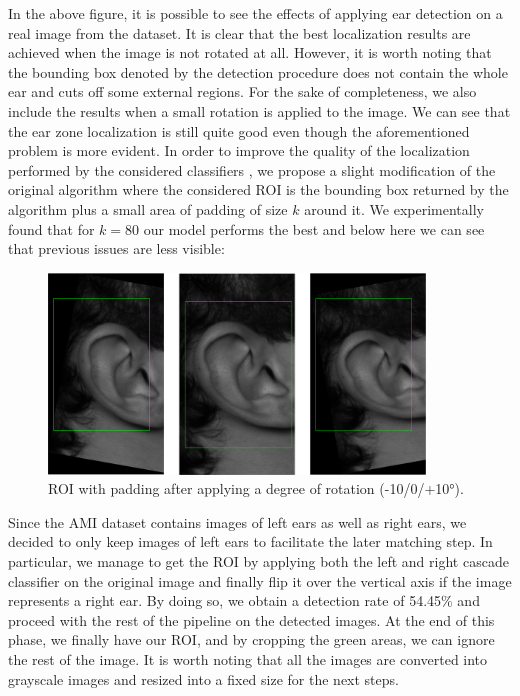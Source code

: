 \documentclass{article}
\begin{document}
In the above figure, it is possible to see the effects of applying ear detection on a real image from the
dataset. It is clear that the best localization results are achieved when the image is not rotated at all.
However, it is worth noting that the bounding box denoted by the detection procedure does not contain the
whole ear and cuts off some external regions.  For the sake of completeness, we also include the results when
a small rotation is applied to the image. We can see that the ear zone localization is still quite good even
though the aforementioned problem is more evident.
In order to improve the quality of the localization performed by the considered classifiers \cite{Castrillon11-caepia},
we propose a slight modification of the original algorithm
where the considered ROI is the bounding box returned by the algorithm plus a small area of padding of size
$k$ around it. We experimentally found that for $k=80$ our model performs the best and below here we can
see that previous issues are less visible:

\begin{figure}[h]
    \label{fig:padding_detection}
    \begin{center}
        \includegraphics[width=10cm,keepaspectratio]{images/padding_detection.png}
        \caption{ROI with padding after applying a degree of rotation (-10/0/+10°).}
    \end{center}
\end{figure}

Since the AMI dataset contains images of left ears as well as right ears, we decided to only keep images
of left ears to facilitate the later matching step. In particular, we manage to get the ROI by applying
both the left and right cascade classifier on the original image and finally flip it over the vertical
axis if the image represents a right ear. By doing so, we obtain a detection rate of 54.45\% and proceed
with the rest of the pipeline on the detected images.
At the end of this phase, we finally have our ROI, and by cropping the green areas,
we can ignore the rest of the image. It is worth noting that all the images are converted into
grayscale images and resized into a fixed size for the next steps.
\end{document}
